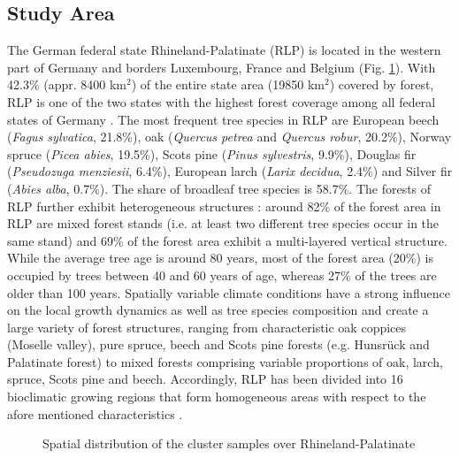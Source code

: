 \subsection{Study Area}
\label{sec:regmod:studyarea}

The German federal state Rhineland-Palatinate (RLP) is located in the western part of Germany and borders Luxembourg, France and Belgium (Fig. \ref{fig:Study Area}). With 42.3\% (appr. 8400 km$^2$) of the entire state area (19850 km$^2$) covered by forest, RLP is one of the two states with the highest forest coverage among all federal states of Germany \citep{bwi3}.  The most frequent tree species in RLP are European beech (\textit{Fagus sylvatica}, 21.8\%), oak (\textit{Quercus petrea} and \textit{Quercus robur}, 20.2\%), Norway spruce (\textit{Picea abies}, 19.5\%), Scots pine (\textit{Pinus sylvestris}, 9.9\%), Douglas fir (\textit{Pseudozuga menziesii}, 6.4\%), European larch (\textit{Larix decidua}, 2.4\%) and Silver fir (\textit{Abies alba}, 0.7\%). The share of broadleaf tree species is 58.7\%. The forests of RLP further exhibit heterogeneous structures \citep{bwi3}: around 82\% of the forest area in RLP are mixed forest stands (i.e. at least two different tree species occur in the same stand) and 69\% of the forest area exhibit a multi-layered vertical structure. While the average tree age is around 80 years, most of the forest area (20\%) is occupied by trees between 40 and 60 years of age, whereas 27\% of the trees are older than 100 years. Spatially variable climate conditions have a strong influence on the local growth dynamics as well as tree species composition and create a large variety of forest structures, ranging from characteristic oak coppices (Moselle valley), pure spruce, beech and Scots pine forests (e.g. Hunsr{\"u}ck and Palatinate forest) to mixed forests comprising variable proportions of oak, larch, spruce, Scots pine and beech. Accordingly, RLP has been divided into 16 bioclimatic growing regions that form homogeneous areas with respect to the afore mentioned characteristics \citep{gauer2005}.

\begin{figure}[H]
	\centering
	\caption{Spatial distribution of the \bwi{} cluster samples over Rhineland-Palatinate}
	\label{fig:Study Area}
\end{figure}

